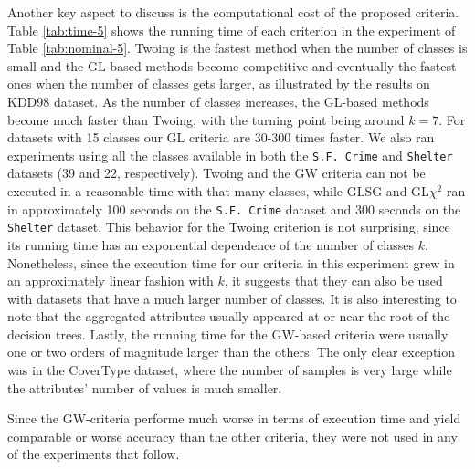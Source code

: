 Another key aspect to discuss is the computational cost of the
proposed criteria. Table \ref{tab:time-5} shows the running time of each criterion in the experiment of Table \ref{tab:nominal-5}. Twoing is the fastest method when the number of classes is small and the GL-based methods become competitive and eventually the
fastest ones when the number of classes gets larger, as illustrated by the results on KDD98 dataset. As the number of classes increases, the GL-based methods become much faster than Twoing, with the turning point being around $k=7$. For datasets with 15 classes our GL criteria are 30-300 times faster. We also ran experiments using all the classes available in both the {\tt S.F. Crime} and {\tt Shelter} datasets (39 and 22, respectively). Twoing and the GW criteria can not be executed in a reasonable time with that many classes, while GLSG and GL$\chi^2$ ran in approximately 100 seconds on the {\tt S.F. Crime} dataset and  300 seconds on the {\tt Shelter} dataset.  This behavior for the Twoing criterion is not surprising, since its running time has an exponential dependence of the number of classes $k$. Nonetheless, since the execution time for our criteria in this experiment grew in an approximately linear fashion with $k$, it suggests that they can also be used with datasets that have a much larger number of classes. It is also interesting to note that the aggregated attributes usually appeared at or near the root of the decision trees. Lastly, the running time for the GW-based criteria were usually one or two orders of magnitude larger than the others. The only clear exception was in the CoverType dataset, where the number of samples is very large while the attributes’ number of values is much smaller.

Since the GW-criteria performe much worse in terms of execution time and yield comparable or worse accuracy than the other criteria, they were not used in any of the experiments that follow.

